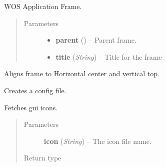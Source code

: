 \documentclass[letterpaper,10pt,english]{sphinxmanual}
\begin{document}
\begin{fulllineitems}
\label{wos:wos.GUI}
WOS Application Frame.
\begin{quote}\begin{description}
\item[{Parameters}] \leavevmode\begin{itemize}
\item {} 
\textbf{parent} () -- Parent frame.

\item {} 
\textbf{title} (\emph{String}) -- Title for the frame

\end{itemize}

\end{description}\end{quote}

\begin{fulllineitems}
\label{wos:wos.GUI.AlignCenterTop}
Aligns frame to Horizontal center and vertical top.

\end{fulllineitems}


\begin{fulllineitems}
\label{wos:wos.GUI.CreateConfig}
Creates a config file.

\end{fulllineitems}


\begin{fulllineitems}
\label{wos:wos.GUI.GetIcon}
Fetches gui icons.
\begin{quote}\begin{description}
\item[{Parameters}] \leavevmode
\textbf{icon} (\emph{String}) -- The icon file name.

\item[{Return type}] \leavevmode
{}

\end{description}\end{quote}

\end{fulllineitems}


\end{fulllineitems}
\end{document}

